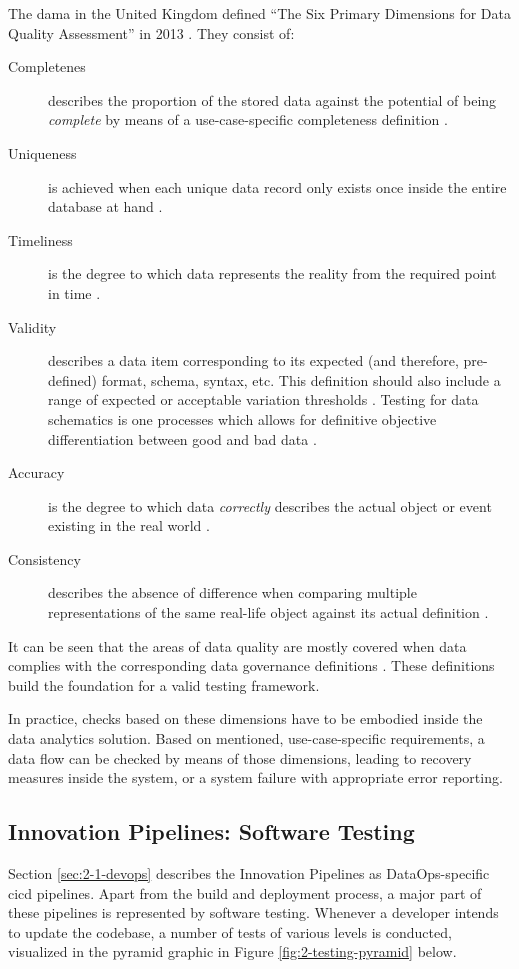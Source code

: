 The \ac{dama} in the United Kingdom defined \enquote{The Six Primary Dimensions for Data Quality Assessment} in 2013 \cite[7\psqq]{Askham2013}. They consist of:

\begin{description}
	\item[Completenes] describes the proportion of the stored data against the potential of being \textit{complete} by means of a use-case-specific completeness definition \cite[8]{Askham2013}\cite{Shen2019}.
	\item[Uniqueness] is achieved when each unique data record only exists once inside the entire database at hand \cite[9]{Askham2013}.
	\item[Timeliness] is the degree to which data represents the reality from the required point in time \cite[10]{Askham2013}.
	\item[Validity] describes a data item corresponding to its expected (and therefore, pre-defined) format, schema, syntax, etc. This definition should also include a range of expected or acceptable variation thresholds \cite[11]{Askham2013}. Testing for data schematics is one processes which allows for definitive objective differentiation between good and bad data \cite{Schieferdecker2012}.
	\item[Accuracy] is the degree to which data \textit{correctly} describes the actual object or event existing in the real world \cite[12]{Askham2013}.
	\item[Consistency] describes the absence of difference when comparing multiple representations of the same real-life object against its actual definition \cite[13]{Askham2013}.
\end{description}

It can be seen that the areas of data quality are mostly covered when data complies with the corresponding data governance definitions \cite{Schieferdecker2012}. These definitions build the foundation for a valid testing framework.

In practice, checks based on these dimensions have to be embodied inside the data analytics solution. Based on mentioned, use-case-specific requirements, a data flow can be checked by means of those dimensions, leading to recovery measures inside the system, or a system failure with appropriate error reporting.

\subsection{Innovation Pipelines: Software Testing}
Section \ref{sec:2-1-devops} describes the Innovation Pipelines as DataOps-specific \ac{cicd} pipelines. Apart from the build and deployment process, a major part of these pipelines is represented by software testing. Whenever a developer intends to update the codebase, a number of tests of various levels is conducted, visualized in the pyramid graphic in Figure \ref{fig:2-testing-pyramid} below.

